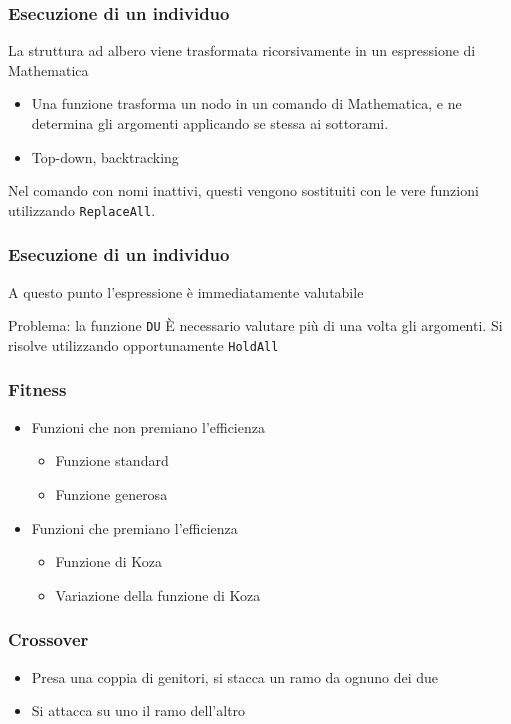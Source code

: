 \documentclass{beamer} %
\begin{document}
\begin{frame}
\frametitle{Esecuzione di un individuo}
La struttura ad albero viene trasformata ricorsivamente in un espressione di Mathematica
\begin{itemize}
\item Una funzione trasforma un nodo in un comando di Mathematica, e ne determina gli argomenti applicando se stessa ai sottorami.
\item Top-down, backtracking
\end{itemize}
\end{frame}



\begin{frame}
Nel comando con nomi inattivi, questi vengono sostituiti con le vere funzioni utilizzando \texttt{ReplaceAll}. 


\frametitle{Esecuzione di un individuo}
A questo punto l'espressione è immediatamente valutabile


\begin{block}{Problema: la funzione \texttt{DU}}
È necessario valutare più di una volta gli argomenti. Si risolve utilizzando opportunamente \texttt{HoldAll} 
\end{block}

\end{frame}

\begin{frame}
\frametitle{Fitness}
\begin{itemize}
\item Funzioni che non premiano l'efficienza
\begin{itemize}
\item Funzione standard
\item Funzione generosa
\end{itemize}
\end{itemize}

\begin{itemize}
\item Funzioni che premiano l'efficienza
\begin{itemize}
\item Funzione di Koza
\item Variazione della funzione di Koza
\end{itemize}
\end{itemize}


\end{frame}

\begin{frame}
\frametitle{Crossover}
\begin{itemize}
\item Presa una coppia di genitori, si stacca un ramo da ognuno dei due
\item Si attacca su uno il ramo dell'altro
\end{itemize}

\end{frame}
\end{document}
